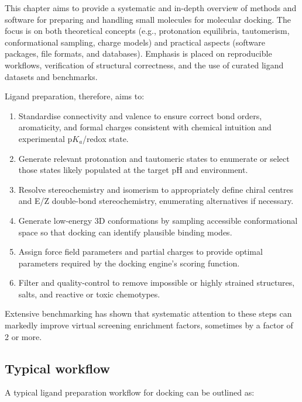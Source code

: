 \documentclass[12pt]{article}
\begin{document}
This chapter aims to provide a systematic and in-depth overview of methods and software for preparing and handling small molecules for molecular docking. The focus is on both theoretical concepts (e.g., protonation equilibria, tautomerism, conformational sampling, charge models) and practical aspects (software packages, file formats, and databases). Emphasis is placed on reproducible workflows, verification of structural correctness, and the use of curated ligand datasets and benchmarks. 

Ligand preparation, therefore, aims to:
\begin{enumerate}
  \item Standardise connectivity and valence to ensure correct bond orders, aromaticity, and formal charges consistent with chemical intuition and experimental p$K_a$/redox state.
  \item Generate relevant protonation and tautomeric states to enumerate or select those states likely populated at the target pH and environment.
  \item Resolve stereochemistry and isomerism to appropriately define chiral centres and E/Z double-bond stereochemistry, enumerating alternatives if necessary.
  \item Generate low-energy 3D conformations by sampling accessible conformational space so that docking can identify plausible binding modes.
  \item Assign force field parameters and partial charges to provide optimal parameters required by the docking engine's scoring function.
  \item Filter and quality-control to remove impossible or highly strained structures, salts, and reactive or toxic chemotypes.
\end{enumerate}

Extensive benchmarking has shown that systematic attention to these steps can markedly improve virtual screening enrichment factors, sometimes by a factor of 2 or more\cite{CH6_Sastry2013,CH6_DEKOIS2}.

\subsection{Typical workflow}

A typical ligand preparation workflow for docking can be outlined as:
\end{document}
